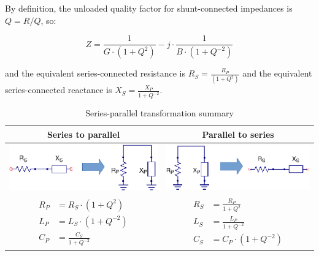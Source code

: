 \noindent By definition, the unloaded quality factor for shunt-connected impedances is $Q = R/Q$, so:

\begin{equation}
Z = \frac{1}{G \cdot (1 + Q^2)} - j \cdot \frac{1}{B \cdot (1 + Q^{-2})}
\end{equation}

\noindent and the equivalent series-connected resistance is $R_S = \frac{R_P}{(1 + Q^2)}$ and the equivalent series-connected reactance is $X_S = \frac{X_P} {1 + Q^{-2}}$.

\begin{table}[H]
  \centering
  \begin{tabular}{ | c | c | }
    \hline
    Series to parallel & Parallel to series\\ \hline
    \begin{minipage}{.4\textwidth}
      \includegraphics[width=\linewidth]{Series_to_parallel}
    \end{minipage}
    &
    \begin{minipage}{.4\textwidth}
      \includegraphics[width=\linewidth]{Parallel_to_series}
    \end{minipage}
    \\ \hline
    \begin{minipage}{.4\textwidth}
         {\begin{align}
           R_P &= R_S \cdot (1 + Q^2)\\
           L_P &= L_S \cdot (1 + Q^{-2})\\
           C_P &= \frac{C_S}{1 + Q^{-2}}
         \end{align}}
    \end{minipage}
    &
        \begin{minipage}{.4\textwidth}
         {\begin{align}
           R_S &= \frac{R_P}{1 + Q^2}\\
           L_S &= \frac{L_P}{1 + Q^{-2}}\\
           C_S &= C_P \cdot (1 + Q^{-2})
         \end{align}}
    \end{minipage}
    \\ \hline
  \end{tabular}
  \caption{Series-parallel transformation summary}
  \label{tbl:Qtrans_summary}
\end{table}

